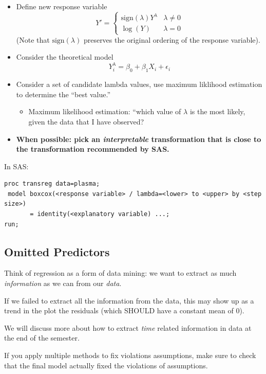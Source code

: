 \documentclass[12pt]{notes}
\begin{document}
\begin{itemize}
\item Define new response variable 
\[Y' = 
\begin{cases} 
\text{sign}(\lambda)Y^\lambda & \lambda \ne 0 \\
\log(Y) & \lambda = 0
\end{cases}
\]
(Note that $\text{sign}(\lambda)$ preserves the original ordering of the response variable). 
\item Consider the theoretical model
\[Y_i^\lambda = \beta_0 + \beta_1X_i + \epsilon_i\]
\item Consider a set of candidate lambda values, use maximum liklihood estimation to determine the ``best value.''
\begin{itemize}
\item Maximum likelihood estimation: ``which value of $\lambda$ is the most likely, given the data that I have observed?
\end{itemize}
\item \textbf{When possible: pick an \textit{interpretable} transformation that is close to the transformation recommended by SAS.}

\begin{minipage}[l][1cm][c]{\textwidth}

\end{minipage}

\end{itemize}

In SAS:
\begin{verbatim}
proc transreg data=plasma;
 model boxcox(<response variable> / lambda=<lower> to <upper> by <step size>) 
       = identity(<explanatory variable) ...;
run;
\end{verbatim}

\subsection*{Omitted Predictors}
Think of regression as a form of data mining: we want to extract as much \textit{information} as we can from our \textit{data}.

\nspace
If we failed to extract all the information from the data, this may show up as a trend in the plot the residuals (which SHOULD have a constant mean of 0). 

\nspace
We will discuss more about how to extract \textit{time} related information in data at the end of the semester. 

\nspace
If you apply multiple methods to fix violations assumptions, make sure to check that the final model actually fixed the violations of assumptions. 
















\end{document}
